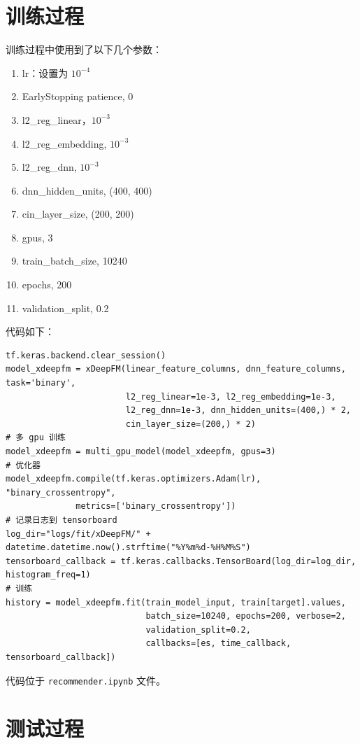 \documentclass[degree=project,degree-type=project,cjk-font=noto]{thuthesis}
\begin{document}
\section{训练过程}
训练过程中使用到了以下几个参数：

\begin{enumerate}
  \item lr：设置为 $10^{-4}$
  \item EarlyStopping patience, 0
  \item l2\_reg\_linear，$10^{-3}$
  \item l2\_reg\_embedding, $10^{-3}$
  \item l2\_reg\_dnn, $10^{-3}$
  \item dnn\_hidden\_units, (400, 400)
  \item cin\_layer\_size, (200, 200)
  \item gpus, 3
  \item train\_batch\_size, 10240
  \item epochs, 200
  \item validation\_split, 0.2
\end{enumerate}

代码如下：

  \begin{verbatim}
tf.keras.backend.clear_session()
model_xdeepfm = xDeepFM(linear_feature_columns, dnn_feature_columns, task='binary',
                        l2_reg_linear=1e-3, l2_reg_embedding=1e-3,
                        l2_reg_dnn=1e-3, dnn_hidden_units=(400,) * 2,
                        cin_layer_size=(200,) * 2)
# 多 gpu 训练
model_xdeepfm = multi_gpu_model(model_xdeepfm, gpus=3)
# 优化器
model_xdeepfm.compile(tf.keras.optimizers.Adam(lr), "binary_crossentropy",
              metrics=['binary_crossentropy'])
# 记录日志到 tensorboard
log_dir="logs/fit/xDeepFM/" + datetime.datetime.now().strftime("%Y%m%d-%H%M%S")
tensorboard_callback = tf.keras.callbacks.TensorBoard(log_dir=log_dir, histogram_freq=1)
# 训练
history = model_xdeepfm.fit(train_model_input, train[target].values,
                            batch_size=10240, epochs=200, verbose=2,
                            validation_split=0.2,
                            callbacks=[es, time_callback, tensorboard_callback])
  \end{verbatim}


代码位于 \texttt{recommender.ipynb} 文件。

\section{测试过程}
\end{document}
